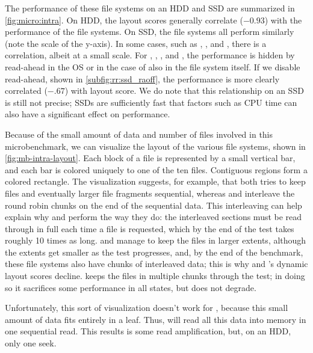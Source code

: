 

The performance of these file systems on an HDD and SSD are summarized in
\cref{fig:micro:intra}. On HDD, the layout scores generally correlate
($-0.93$) with the performance of the file systems.  On SSD, the file systems
all perform similarly (note the scale of the y-axis).  In some cases, such as
\xfs, \ext, and \zfs, there is a correlation, albeit at a small scale.  For
\btrfs, \ext, \xfs, and \ftwofs, the performance is hidden by read-ahead in the
OS or in the case of \btrfs also in the file system itself. If we disable
read-ahead, shown in \cref{subfig:rr:ssd_raoff}, the performance is more
clearly correlated ($-.67$) with layout score.  We do note that this
relationship on an SSD is still not precise; SSDs are sufficiently fast that
factors such as CPU time can also have a significant effect on performance.



Because of the small amount of data and number of files involved in this
microbenchmark, we can visualize the layout of the various file systems, shown
in \cref{fig:mb-intra-layout}. Each block of a file is represented by a
small vertical bar, and each bar is colored uniquely to one of the ten files.
Contiguous regions form a colored rectangle.  The visualization suggests, for
example, that \ext both tries to keep files and eventually larger file
fragments sequential, whereas \btrfs and \ftwofs interleave the round robin
chunks on the end of the sequential data. This interleaving can help explain
why \btrfs and \ftwofs perform the way they do: the interleaved sections must
be read through in full each time a file is requested, which by the end of the
test takes roughly 10 times as long. \ext and \xfs manage to keep the files in
larger extents, although the extents get smaller as the test progresses, and,
by the end of the benchmark, these file systems also have chunks of interleaved
data; this is why \ext and \xfs's  dynamic layout scores decline.  \zfs keeps
the files in multiple chunks through the test; in doing so it sacrifices some
performance in all states, but does not degrade.

Unfortunately, this sort of visualization doesn't work for \betrfs, because
this small amount of data fits entirely in a leaf.  Thus, \betrfs will read all
this data into memory in one sequential read. This results is some read
amplification, but, on an HDD, only one seek.




